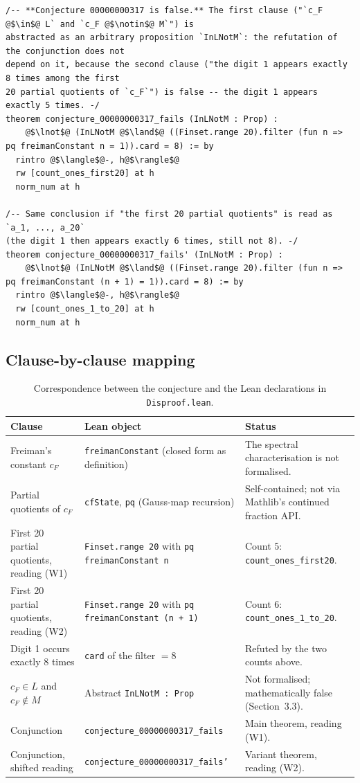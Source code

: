 \documentclass[11pt]{article}
\begin{document}
\begin{lstlisting}
/-- **Conjecture 00000000317 is false.** The first clause ("`c_F @$\in$@ L` and `c_F @$\notin$@ M`") is
abstracted as an arbitrary proposition `InLNotM`: the refutation of the conjunction does not
depend on it, because the second clause ("the digit 1 appears exactly 8 times among the first
20 partial quotients of `c_F`") is false -- the digit 1 appears exactly 5 times. -/
theorem conjecture_00000000317_fails (InLNotM : Prop) :
    @$\lnot$@ (InLNotM @$\land$@ ((Finset.range 20).filter (fun n => pq freimanConstant n = 1)).card = 8) := by
  rintro @$\langle$@-, h@$\rangle$@
  rw [count_ones_first20] at h
  norm_num at h

/-- Same conclusion if "the first 20 partial quotients" is read as `a_1, ..., a_20`
(the digit 1 then appears exactly 6 times, still not 8). -/
theorem conjecture_00000000317_fails' (InLNotM : Prop) :
    @$\lnot$@ (InLNotM @$\land$@ ((Finset.range 20).filter (fun n => pq freimanConstant (n + 1) = 1)).card = 8) := by
  rintro @$\langle$@-, h@$\rangle$@
  rw [count_ones_1_to_20] at h
  norm_num at h
\end{lstlisting}

\subsection{Clause-by-clause mapping}

\begin{table}[h]
\centering
\small
{\footnotesize
\begin{tabular}{p{2.9cm}p{4.3cm}p{4.2cm}}
\toprule
Clause & Lean object & Status \\
\midrule
Freiman's constant $c_F$ & \texttt{freimanConstant} (closed form as definition) & The spectral characterisation is not formalised. \\
Partial quotients of $c_F$ & \texttt{cfState}, \texttt{pq} (Gauss-map recursion) & Self-contained; not via Mathlib's continued fraction API. \\
First 20 partial quotients, reading (W1) & \texttt{Finset.range 20} with \texttt{pq freimanConstant n} & Count $5$: \texttt{count\_ones\_first20}. \\
First 20 partial quotients, reading (W2) & \texttt{Finset.range 20} with \texttt{pq freimanConstant (n + 1)} & Count $6$: \texttt{count\_ones\_1\_to\_20}. \\
Digit 1 occurs exactly 8 times & \texttt{card} of the filter $= 8$ & Refuted by the two counts above. \\
$c_F \in L$ and $c_F \notin M$ & Abstract \texttt{InLNotM : Prop} & Not formalised; mathematically false (Section~3.3). \\
Conjunction & \texttt{conjecture\_00000000317\_fails} & Main theorem, reading (W1). \\
Conjunction, shifted reading & \texttt{conjecture\_00000000317\_fails'} & Variant theorem, reading (W2). \\
\bottomrule
\end{tabular}}
\caption{Correspondence between the conjecture and the Lean declarations in \texttt{Disproof.lean}.}
\end{table}
\end{document}
